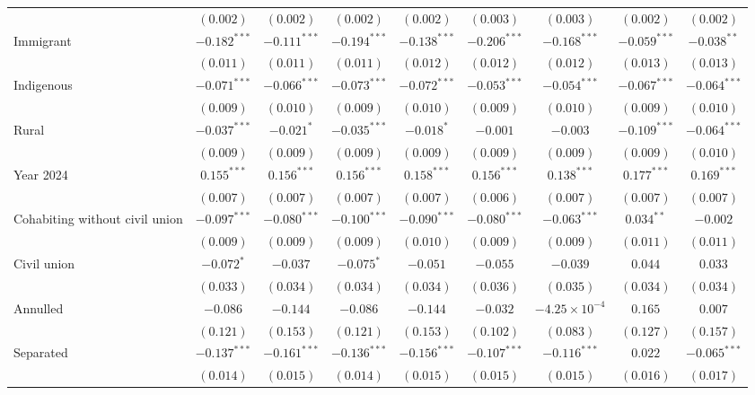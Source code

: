 \begin{table}[htpb]
{\begin{tabular}{l c c c c c c c c}
 & $(0.002)$ & $(0.002)$ & $(0.002)$ & $(0.002)$ & $(0.003)$ & $(0.003)$ & $(0.002)$ & $(0.002)$ \\
Immigrant & $-0.182^{***}$ & $-0.111^{***}$ & $-0.194^{***}$ & $-0.138^{***}$ & $-0.206^{***}$ & $-0.168^{***}$ & $-0.059^{***}$ & $-0.038^{**}$ \\
 & $(0.011)$ & $(0.011)$ & $(0.011)$ & $(0.012)$ & $(0.012)$ & $(0.012)$ & $(0.013)$ & $(0.013)$ \\
Indigenous & $-0.071^{***}$ & $-0.066^{***}$ & $-0.073^{***}$ & $-0.072^{***}$ & $-0.053^{***}$ & $-0.054^{***}$ & $-0.067^{***}$ & $-0.064^{***}$ \\
 & $(0.009)$ & $(0.010)$ & $(0.009)$ & $(0.010)$ & $(0.009)$ & $(0.010)$ & $(0.009)$ & $(0.010)$ \\
Rural & $-0.037^{***}$ & $-0.021^{*}$ & $-0.035^{***}$ & $-0.018^{*}$ & $-0.001$ & $-0.003$ & $-0.109^{***}$ & $-0.064^{***}$ \\
 & $(0.009)$ & $(0.009)$ & $(0.009)$ & $(0.009)$ & $(0.009)$ & $(0.009)$ & $(0.009)$ & $(0.010)$ \\
Year 2024 & $0.155^{***}$ & $0.156^{***}$ & $0.156^{***}$ & $0.158^{***}$ & $0.156^{***}$ & $0.138^{***}$ & $0.177^{***}$ & $0.169^{***}$ \\
 & $(0.007)$ & $(0.007)$ & $(0.007)$ & $(0.007)$ & $(0.006)$ & $(0.007)$ & $(0.007)$ & $(0.007)$ \\
Cohabiting without civil union & $-0.097^{***}$ & $-0.080^{***}$ & $-0.100^{***}$ & $-0.090^{***}$ & $-0.080^{***}$ & $-0.063^{***}$ & $0.034^{**}$ & $-0.002$ \\
 & $(0.009)$ & $(0.009)$ & $(0.009)$ & $(0.010)$ & $(0.009)$ & $(0.009)$ & $(0.011)$ & $(0.011)$ \\
Civil union & $-0.072^{*}$ & $-0.037$ & $-0.075^{*}$ & $-0.051$ & $-0.055$ & $-0.039$ & $0.044$ & $0.033$ \\
 & $(0.033)$ & $(0.034)$ & $(0.034)$ & $(0.034)$ & $(0.036)$ & $(0.035)$ & $(0.034)$ & $(0.034)$ \\
Annulled & $-0.086$ & $-0.144$ & $-0.086$ & $-0.144$ & $-0.032$ & $-4.25\times 10^{-4}$ & $0.165$ & $0.007$ \\
 & $(0.121)$ & $(0.153)$ & $(0.121)$ & $(0.153)$ & $(0.102)$ & $(0.083)$ & $(0.127)$ & $(0.157)$ \\
Separated & $-0.137^{***}$ & $-0.161^{***}$ & $-0.136^{***}$ & $-0.156^{***}$ & $-0.107^{***}$ & $-0.116^{***}$ & $0.022$ & $-0.065^{***}$ \\
 & $(0.014)$ & $(0.015)$ & $(0.014)$ & $(0.015)$ & $(0.015)$ & $(0.015)$ & $(0.016)$ & $(0.017)$ \\

\end{tabular}}
\end{table}
